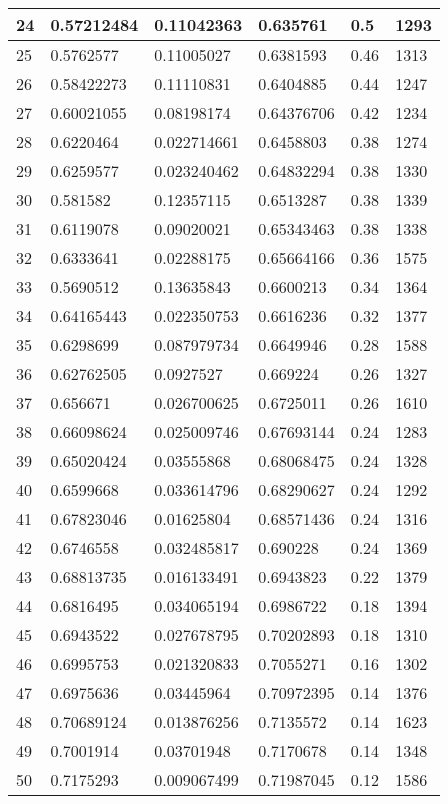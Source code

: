 \begin{longtable}{|l|l|l|l|l|l|}
24 & 0.57212484 & 0.11042363 & 0.635761 & 0.5 & 1293 \\ \hline 
25 & 0.5762577 & 0.11005027 & 0.6381593 & 0.46 & 1313 \\ \hline 
26 & 0.58422273 & 0.11110831 & 0.6404885 & 0.44 & 1247 \\ \hline 
27 & 0.60021055 & 0.08198174 & 0.64376706 & 0.42 & 1234 \\ \hline 
28 & 0.6220464 & 0.022714661 & 0.6458803 & 0.38 & 1274 \\ \hline 
29 & 0.6259577 & 0.023240462 & 0.64832294 & 0.38 & 1330 \\ \hline 
30 & 0.581582 & 0.12357115 & 0.6513287 & 0.38 & 1339 \\ \hline 
31 & 0.6119078 & 0.09020021 & 0.65343463 & 0.38 & 1338 \\ \hline 
32 & 0.6333641 & 0.02288175 & 0.65664166 & 0.36 & 1575 \\ \hline 
33 & 0.5690512 & 0.13635843 & 0.6600213 & 0.34 & 1364 \\ \hline 
34 & 0.64165443 & 0.022350753 & 0.6616236 & 0.32 & 1377 \\ \hline 
35 & 0.6298699 & 0.087979734 & 0.6649946 & 0.28 & 1588 \\ \hline 
36 & 0.62762505 & 0.0927527 & 0.669224 & 0.26 & 1327 \\ \hline 
37 & 0.656671 & 0.026700625 & 0.6725011 & 0.26 & 1610 \\ \hline 
38 & 0.66098624 & 0.025009746 & 0.67693144 & 0.24 & 1283 \\ \hline 
39 & 0.65020424 & 0.03555868 & 0.68068475 & 0.24 & 1328 \\ \hline 
40 & 0.6599668 & 0.033614796 & 0.68290627 & 0.24 & 1292 \\ \hline 
41 & 0.67823046 & 0.01625804 & 0.68571436 & 0.24 & 1316 \\ \hline 
42 & 0.6746558 & 0.032485817 & 0.690228 & 0.24 & 1369 \\ \hline 
43 & 0.68813735 & 0.016133491 & 0.6943823 & 0.22 & 1379 \\ \hline 
44 & 0.6816495 & 0.034065194 & 0.6986722 & 0.18 & 1394 \\ \hline 
45 & 0.6943522 & 0.027678795 & 0.70202893 & 0.18 & 1310 \\ \hline 
46 & 0.6995753 & 0.021320833 & 0.7055271 & 0.16 & 1302 \\ \hline 
47 & 0.6975636 & 0.03445964 & 0.70972395 & 0.14 & 1376 \\ \hline 
48 & 0.70689124 & 0.013876256 & 0.7135572 & 0.14 & 1623 \\ \hline 
49 & 0.7001914 & 0.03701948 & 0.7170678 & 0.14 & 1348 \\ \hline 
50 & 0.7175293 & 0.009067499 & 0.71987045 & 0.12 & 1586 \\ \hline 
\end{longtable}